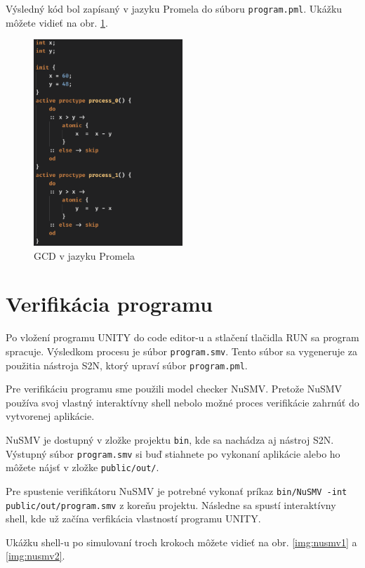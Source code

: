 Výsledný kód bol zapísaný v jazyku Promela do súboru \texttt{program.pml}. Ukážku môžete vidieť na obr. 
\ref{img:gcd}.

\begin{figure}[H]
    \centerline{\includegraphics[width=0.5\textwidth]{images/gcd}}
    \caption[GCD v jazyku Promela]{GCD v jazyku Promela}
    \label{img:gcd}
\end{figure}


\section{Verifikácia programu}
Po vložení programu UNITY do code editor-u a stlačení tlačidla RUN sa program spracuje. Výsledkom 
procesu je súbor \texttt{program.smv}. Tento súbor sa vygeneruje za použitia nástroja S2N, ktorý
upraví súbor \texttt{program.pml}. 

Pre verifikáciu programu sme použili model checker NuSMV. Pretože 
NuSMV používa svoj vlastný interaktívny shell nebolo možné proces verifikácie zahrnúť do vytvorenej aplikácie.

NuSMV je dostupný v zložke projektu \texttt{bin}, kde sa nachádza aj nástroj S2N. Výstupný súbor 
\texttt{program.smv} si buď stiahnete po vykonaní aplikácie alebo ho môžete nájsť v zložke \texttt{public/out/}.

Pre spustenie verifikátoru NuSMV je potrebné vykonať príkaz \texttt{bin/NuSMV -int public/out/program.smv} z
koreňu projektu. Následne sa spustí interaktívny shell, kde už začína verfikácia vlastností programu UNITY.

Ukážku shell-u po simulovaní troch krokoch môžete vidieť na obr. \ref{img:nusmv1} a \ref{img:nusmv2}.


